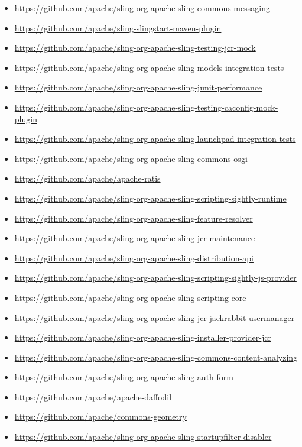 \documentclass[sigconf]{acmart}
\begin{document}
\begin{itemize}
  \item \url{https://github.com/apache/sling-org-apache-sling-commons-messaging}
  \item \url{https://github.com/apache/sling-slingstart-maven-plugin}
  \item \url{https://github.com/apache/sling-org-apache-sling-testing-jcr-mock}
  \item \url{https://github.com/apache/sling-org-apache-sling-models-integration-tests}
  \item \url{https://github.com/apache/sling-org-apache-sling-junit-performance}
  \item \url{https://github.com/apache/sling-org-apache-sling-testing-caconfig-mock-plugin}
  \item \url{https://github.com/apache/sling-org-apache-sling-launchpad-integration-tests}
  \item \url{https://github.com/apache/sling-org-apache-sling-commons-osgi}
  \item \url{https://github.com/apache/apache-ratis}
  \item \url{https://github.com/apache/sling-org-apache-sling-scripting-sightly-runtime}
  \item \url{https://github.com/apache/sling-org-apache-sling-feature-resolver}
  \item \url{https://github.com/apache/sling-org-apache-sling-jcr-maintenance}
  \item \url{https://github.com/apache/sling-org-apache-sling-distribution-api}
  \item \url{https://github.com/apache/sling-org-apache-sling-scripting-sightly-js-provider}
  \item \url{https://github.com/apache/sling-org-apache-sling-scripting-core}
  \item \url{https://github.com/apache/sling-org-apache-sling-jcr-jackrabbit-usermanager}
  \item \url{https://github.com/apache/sling-org-apache-sling-installer-provider-jcr}
  \item \url{https://github.com/apache/sling-org-apache-sling-commons-content-analyzing}
  \item \url{https://github.com/apache/sling-org-apache-sling-auth-form}
  \item \url{https://github.com/apache/apache-daffodil}
  \item \url{https://github.com/apache/commons-geometry}
  \item \url{https://github.com/apache/sling-org-apache-sling-startupfilter-disabler}

\end{itemize}
\end{document}
